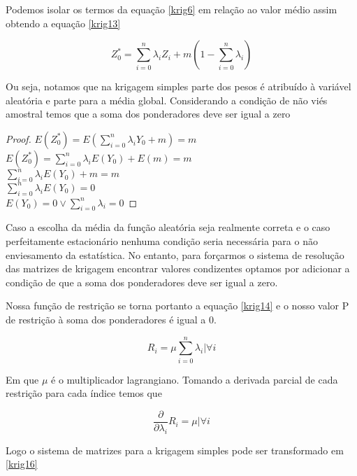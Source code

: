  Podemos isolar os termos da equação \eqref{krig6} em relação ao valor médio assim obtendo a equação \eqref{krig13}
 
 \begin{equation}\label{krig13}
 Z^*_{0} = \sum_{i=0}^{n} \lambda_{i} Z_{i} + m\left(1- \sum_{i=0}^{n}\lambda_{i} \right)
 \end{equation} 

Ou seja, notamos que na krigagem simples parte dos pesos é atribuído à variável aleatória e parte para a média global. Considerando a condição de não viés amostral temos que a soma dos ponderadores deve ser igual a zero 

\begin{proof}
$E\left(Z^*_{0}\right) = E\left(\sum_{i=0}^{n} \lambda_{i}Y_{0} + m \right) = m $\\
$E\left(Z^*_{0}\right) = \sum_{i=0}^{n} \lambda_{i}E\left( Y_{0} \right) + E(m) = m $\\
$\sum_{i=0}^{n} \lambda_{i}E\left( Y_{0} \right) + m = m $\\
$\sum_{i=0}^{n} \lambda_{i}E\left( Y_{0} \right)  = 0 $\\
$E\left( Y_{0} \right)  = 0 \vee \sum_{i=0}^{n} \lambda_{i} = 0 $
\end{proof}

Caso a escolha da média da função aleatória seja realmente correta e o caso perfeitamente estacionário nenhuma condição seria necessária para o não enviesamento da estatística. No entanto, para forçarmos o sistema de resolução das matrizes de krigagem encontrar valores condizentes optamos por adicionar a condição de que a soma dos ponderadores deve ser igual a zero. 

Nossa função de restrição se torna portanto a equação \eqref{krig14} e o nosso valor P de restrição à soma dos ponderadores é igual a 0.

\begin{equation}\label{krig14}
R_{i} = \mu \sum_{i=0}^{n} \lambda_{i} | \forall i
\end{equation}   

Em que $\mu$ é o multiplicador lagrangiano. Tomando a derivada parcial de cada restrição para cada índice temos que

\begin{equation}\label{krig15}
\frac{\partial}{\partial \lambda_{i}}R_{i} = \mu | \forall i 
\end{equation} 


Logo o sistema de matrizes para  a krigagem simples pode ser transformado em \eqref{krig16}

